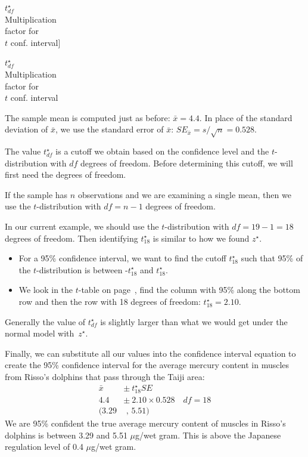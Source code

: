 $t^{\star}_{df}$\vspace{1mm}\\\footnotesize Multiplication\\factor for\\$t$ conf. interval]{\raggedright\vspace{-9mm}

$t^{\star}_{df}$\vspace{1mm}\\\footnotesize Multiplication\\factor for\\$t$ conf. interval}The sample mean is computed just as before: $\bar{x} = 4.4$. In place of the standard deviation of $\bar{x}$, we use the standard error of $\bar{x}$: $SE_{\bar{x}} = s/\sqrt{n} = 0.528$.

The value $t^{\star}_{df}$ is a cutoff we obtain based on the confidence level and the $t$-distribution with $df$ degrees of freedom. Before determining this cutoff, we will first need the degrees of freedom.

\begin{termBox}{
If the sample has $n$ observations and we are examining a single mean, then we use the $t$-distribution with $df=n-1$ degrees of freedom.}
\end{termBox}

In our current example, we should use the $t$-distribution with $df=19-1=18$ degrees of freedom. Then identifying $t_{18}^{\star}$ is similar to how we found $z^{\star}$.
\begin{itemize}
\setlength{\itemsep}{0mm}
\item For a 95\% confidence interval, we want to find the cutoff $t^{\star}_{18}$ such that 95\% of the $t$-distribution is between -$t^{\star}_{18}$ and $t^{\star}_{18}$.
\item We look in the $t$-table on page~\pageref{tTableSample_ch_inf_means}, find the column with 95\% along the bottom row and then the row with 18 degrees of freedom: $t^{\star}_{18} = 2.10$.
\end{itemize}
Generally the value of $t^{\star}_{df}$ is slightly larger than what we would get under the normal model with~$z^{\star}$.

Finally, we can substitute all our values into the confidence interval equation to create the 95\% confidence interval for the average mercury content in muscles from Risso's dolphins that pass through the Taiji area:
\begin{align*}
\bar{x} \ &\pm\  t^{\star}_{18}SE  \\
4.4 \ &\pm\  2.10 \times 0.528 \quad df=18 \\
(3.29 &\text{ , } 5.51)
\end{align*}
We are 95\% confident the true average mercury content of muscles in Risso's dolphins is between 3.29 and 5.51 $\mu$g/wet gram. This is above the Japanese regulation level of 0.4 $\mu$g/wet gram.

